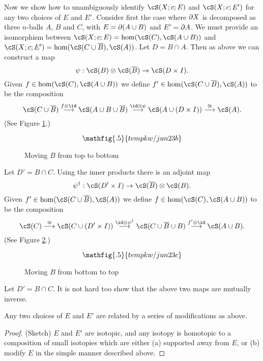 Now we show how to unambiguously identify $\cS(X; c; E)$ and $\cS(X; c; E')$ for any
two choices of $E$ and $E'$.
Consider first the case where $\partial X$ is decomposed as three $n$-balls $A$, $B$ and $C$,
with $E = \partial(A\cup B)$ and $E' = \partial A$.
We must provide an isomorphism between $\cS(X; c; E) = \hom(\cS(C), \cS(A\cup B))$
and $\cS(X; c; E') = \hom(\cS(C\cup \ol{B}), \cS(A))$.
Let $D = B\cap A$.
Then as above we can construct a map
\[
	\psi: \cS(B)\ot\cS(\ol{B}) \to \cS(D\times I) .
\]
Given $f\in \hom(\cS(C), \cS(A\cup B))$ we define $f'\in \hom(\cS(C\cup \ol{B}), \cS(A))$
to be the composition
\[
	\cS(C\cup \ol{B}) \stackrel{f\ot\id}{\longrightarrow}
		\cS(A\cup B\cup \ol{B})  \stackrel{\id\ot\psi}{\longrightarrow}
			\cS(A\cup(D\times I)) \stackrel{\cong}{\longrightarrow} \cS(A) .
\]
(See Figure \ref{jun23b}.)
\begin{figure}[t]
\begin{equation*}
\mathfig{.5}{tempkw/jun23b}
\end{equation*}
\caption{Moving $B$ from top to bottom}
\label{jun23b}
\end{figure}
Let $D' = B\cap C$.
Using the inner products there is an adjoint map
\[
	\psi^\dagger: \cS(D'\times I) \to \cS(\ol{B})\ot\cS(B) .
\]
Given $f'\in \hom(\cS(C\cup \ol{B}), \cS(A))$ we define $f\in \hom(\cS(C), \cS(A\cup B))$
to be the composition
\[
	\cS(C) \stackrel{\cong}{\longrightarrow}
		\cS(C\cup(D'\times I)) \stackrel{\id\ot\psi^\dagger}{\longrightarrow}
			\cS(C\cup \ol{B}\cup B)   \stackrel{f'\ot\id}{\longrightarrow}
				\cS(A\cup B) .
\]
(See Figure \ref{jun23c}.)
\begin{figure}[t]
\begin{equation*}
\mathfig{.5}{tempkw/jun23c}
\end{equation*}
\caption{Moving $B$ from bottom to top}
\label{jun23c}
\end{figure}
Let $D' = B\cap C$.
It is not hard too show that the above two maps are mutually inverse.

\begin{lem}
Any two choices of $E$ and $E'$ are related by a series of modifications as above.
\end{lem}

\begin{proof}
(Sketch)
$E$ and $E'$ are isotopic, and any isotopy is 
homotopic to a composition of small isotopies which are either
(a) supported away from $E$, or (b) modify $E$ in the simple manner described above.
\end{proof}

